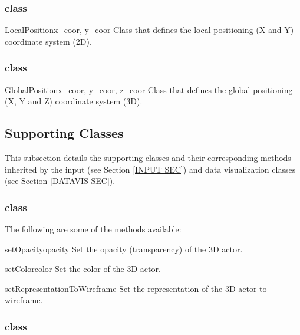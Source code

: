 \subsubsection{\LocalPosition class}

\begin{classdesc}{LocalPosition}{x_coor, y_coor}
Class that defines the local positioning (X and Y) coordinate system (2D).
\end{classdesc}

\subsubsection{\GlobalPosition class}

\begin{classdesc}{GlobalPosition}{x_coor, y_coor, z_coor}
Class that defines the global positioning (X, Y and Z) coordinate system (3D).
\end{classdesc}




\subsection{Supporting Classes}
This subsection details the supporting classes and their corresponding methods 
inherited by the input (see Section \ref{INPUT SEC}) and data 
visualization classes (see Section \ref{DATAVIS SEC}).

\subsubsection{\ActorThreeD class}

The following are some of the methods available:

\begin{methoddesc}[Actor3D]{setOpacity}{opacity}
Set the opacity (transparency) of the 3D actor.
\end{methoddesc}

\begin{methoddesc}[Actor3D]{setColor}{color}
Set the color of the 3D actor.
\end{methoddesc}

\begin{methoddesc}[Actor3D]{setRepresentationToWireframe}{}
Set the representation of the 3D actor to wireframe.
\end{methoddesc}

\subsubsection{\ActorTwoD class}

